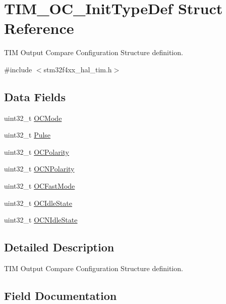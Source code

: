 \hypertarget{struct_t_i_m___o_c___init_type_def}{}\section{T\+I\+M\+\_\+\+O\+C\+\_\+\+Init\+Type\+Def Struct Reference}
\label{struct_t_i_m___o_c___init_type_def}


T\+IM Output Compare Configuration Structure definition.  




{\ttfamily \#include $<$stm32f4xx\+\_\+hal\+\_\+tim.\+h$>$}

\subsection*{Data Fields}
\begin{DoxyCompactItemize}
\item 
uint32\+\_\+t \hyperlink{struct_t_i_m___o_c___init_type_def_ae5faa1cba0b3f1ab6179cc54e1015ee8}{O\+C\+Mode}
\item 
uint32\+\_\+t \hyperlink{struct_t_i_m___o_c___init_type_def_a61fb5b9ef4154de67620ac81085a0e39}{Pulse}
\item 
uint32\+\_\+t \hyperlink{struct_t_i_m___o_c___init_type_def_a556b7137d041aceed3e45c87cbfb39cd}{O\+C\+Polarity}
\item 
uint32\+\_\+t \hyperlink{struct_t_i_m___o_c___init_type_def_a21922d8e2fee659d081c4be4c500d1d4}{O\+C\+N\+Polarity}
\item 
uint32\+\_\+t \hyperlink{struct_t_i_m___o_c___init_type_def_a4c4203c5ed779ac86fb793bb9d628e55}{O\+C\+Fast\+Mode}
\item 
uint32\+\_\+t \hyperlink{struct_t_i_m___o_c___init_type_def_ace3e2b76ca2fca0f4961585ed9ebecf5}{O\+C\+Idle\+State}
\item 
uint32\+\_\+t \hyperlink{struct_t_i_m___o_c___init_type_def_a0d70cc51990d7433fd76cc6ed1d06237}{O\+C\+N\+Idle\+State}
\end{DoxyCompactItemize}


\subsection{Detailed Description}
T\+IM Output Compare Configuration Structure definition. 

\subsection{Field Documentation}
\mbox{\label{struct_t_i_m___o_c___init_type_def_a4c4203c5ed779ac86fb793bb9d628e55}} 
